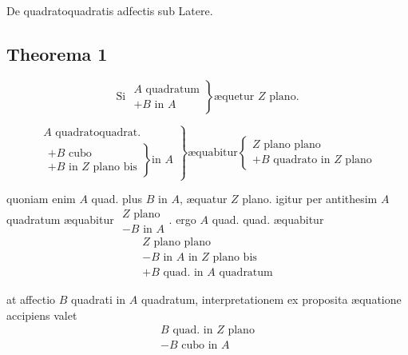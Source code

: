 \documentclass[11pt,a4paper]{article}
\begin{document}
De quadratoquadratis adfectis sub Latere.

\subsection*{Theorema 1}

\[ \text{Si } \left.\begin{array}{l} A \text{ quadratum} \\ + B \text{ in } A \end{array}\right\} \text{æquetur } Z \text{ plano.} \]

\[ \left.\begin{array}{l} A \text{ quadratoquadrat.} \\ \left.\begin{array}{l} + B \text{ cubo} \\ + B \text{ in } Z \text{ plano bis} \end{array}\right\} \text{in } A \end{array}\right\} \text{æquabitur} \left\{\begin{array}{l} Z \text{ plano plano} \\ + B \text{ quadrato in } Z \text{ plano} \end{array}\right. \]

quoniam enim $A$ quad. plus $B$ in $A$, æquatur $Z$ plano. igitur per antithesim $A$ quadratum æquabitur $\begin{array}{l} Z \text{ plano} \\ - B \text{ in } A \end{array}$. ergo $A$ quad. quad. æquabitur
\[ \begin{array}{l} Z \text{ plano plano} \\ - B \text{ in } A \text{ in } Z \text{ plano bis} \\ + B \text{ quad. in } A \text{ quadratum} \end{array} \]

at affectio $B$ quadrati in $A$ quadratum, interpretationem ex proposita æquatione accipiens valet
\[ \begin{array}{l} B \text{ quad. in } Z \text{ plano} \\ - B \text{ cubo in } A \end{array} \]
\end{document}
